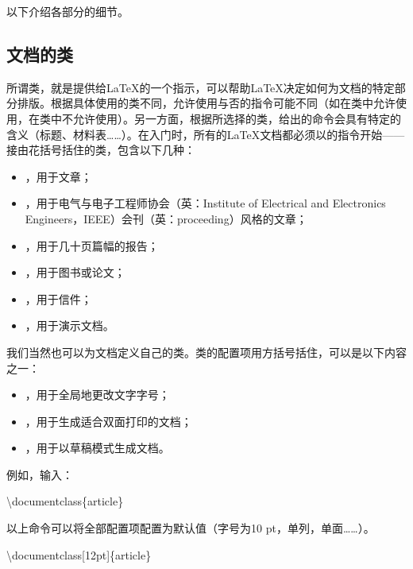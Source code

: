 以下介绍各部分的细节。

\subsection{文档的类}

所谓类，就是提供给\LaTeX 的一个指示，可以帮助\LaTeX 决定如何为文档的特定部分排版。根据具体使用的类不同，允许使用与否的指令可能不同（如在类中允许使用，在类中不允许使用）。另一方面，根据所选择的类，给出的命令会具有特定的含义（标题、材料表……）。在入门时，所有的\LaTeX 文档都必须以的指令开始——接由花括号括住的类，包含以下几种：

\begin{itemize}
    \item {}，用于文章；
    \item {}，用于电气与电子工程师协会（英：Institute of Electrical and Electronics Engineers，IEEE）会刊（英：proceeding）风格的文章；
    \item {}，用于几十页篇幅的报告；
    \item {}，用于图书或论文；
    \item {}，用于信件；
    \item {}，用于演示文档。
\end{itemize}

我们当然也可以为文档定义自己的类。类的配置项用方括号括住，可以是以下内容之一：

\begin{itemize}
    \item \dm{11pt, 12pt}，用于全局地更改文字字号；
    \item {}，用于生成适合双面打印的文档；
    \item {}，用于以草稿模式生成文档。
\end{itemize}

例如，输入：

\begin{dmd}
    \backslash documentclass\{article\}
\end{dmd}

以上命令可以将全部配置项配置为默认值（字号为10 pt，单列，单面……）。

\begin{dmd}
    \backslash documentclass[12pt]\{article\}
\end{dmd}

